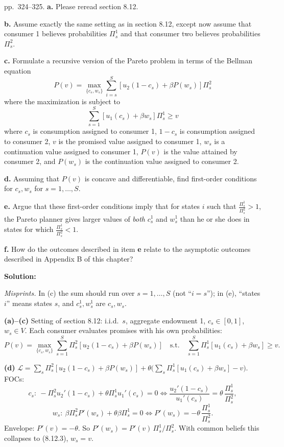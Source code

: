 \documentclass[12pt, letterpaper]{article}
\begin{document}
\begin{tcolorbox}[oddbox,title={Exercise 8.23 \quad Recursive version of Pareto problem}]
\begin{tcolorbox}[questionbox]
pp.~324--325. \textbf{a.} Please reread section 8.12.

\textbf{b.} Assume exactly the same setting as in section 8.12, except now assume that consumer 1 believes
probabilities $\Pi^1_s$ and that consumer two believes probabilities $\Pi^2_s$.

\textbf{c.} Formulate a recursive version of the Pareto problem in terms of the Bellman equation
\[
P(v)=\max_{\{c_s,w_s\}}\sum_{i=s}^S[u_2(1-c_s)+\beta P(w_s)]\Pi^2_s
\]
where the maximization is subject to
\[
\sum_{s=1}^S[u_1(c_s)+\beta w_s]\Pi^1_s\ge v
\]
where $c_s$ is consumption assigned to consumer 1, $1-c_s$ is consumption assigned to consumer 2, $v$ is the
promised value assigned to consumer 1, $w_s$ is a continuation value assigned to consumer 1, $P(v)$ is the
value attained by consumer 2, and $P(w_s)$ is the continuation value assigned to consumer 2.

\textbf{d.} Assuming that $P(v)$ is concave and differentiable, find first-order conditions for $c_s,w_s$ for
$s=1,\dots,S$.

\textbf{e.} Argue that these first-order conditions imply that for states $i$ such that
$\frac{\Pi^1_s}{\Pi^2_s}>1$, the Pareto planner gives larger values of \emph{both} $c^1_s$ and $w^1_s$ than he or
she does in states for which $\frac{\Pi^1_s}{\Pi^2_s}<1$.

\textbf{f.} How do the outcomes described in item \textbf{e} relate to the asymptotic outcomes described in
Appendix B of this chapter?
\end{tcolorbox}

\textbf{Solution:}

\emph{Misprints.} In (c) the sum should run over $s=1,\dots,S$ (not ``$i=s$''); in (e), ``states $i$'' means states $s$,
and $c^1_s,w^1_s$ are $c_s,w_s$.

\textbf{(a)--(c)} Setting of section 8.12: i.i.d.\ $s$, aggregate endowment 1, $c_s\in[0,1]$, $w_s\in V$. Each
consumer evaluates promises with his own probabilities:
\[
P(v)=\max_{\{c_s,w_s\}}\sum_{s=1}^S\Pi^2_s[u_2(1-c_s)+\beta P(w_s)]\quad\text{s.t.}\quad\sum_{s=1}^S\Pi^1_s[u_1(c_s)+\beta w_s]\ge v .
\]

\textbf{(d)} $\mathcal L=\sum_s\Pi^2_s[u_2(1-c_s)+\beta P(w_s)]+\theta\big(\sum_s\Pi^1_s[u_1(c_s)+\beta w_s]-v\big)$. FOCs:
\[
c_s:\ -\Pi^2_su_2'(1-c_s)+\theta\Pi^1_su_1'(c_s)=0\iff\frac{u_2'(1-c_s)}{u_1'(c_s)}=\theta\,\frac{\Pi^1_s}{\Pi^2_s},
\]
\[
w_s:\ \beta\Pi^2_sP'(w_s)+\theta\beta\Pi^1_s=0\iff P'(w_s)=-\theta\,\frac{\Pi^1_s}{\Pi^2_s}.
\]
Envelope: $P'(v)=-\theta$. So $P'(w_s)=P'(v)\,\Pi^1_s/\Pi^2_s$. With common beliefs this collapses to (8.12.3),
$w_s=v$.


\end{tcolorbox}
\end{document}
